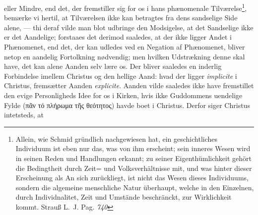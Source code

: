 \documentclass[12pt]{book}
\newcommand{\opage}[1]{\marginnote{\footnotesize\textit{[#1]}}}
\begin{document}
eller
\opage{153} \setcounter{footnote}{0}%
Mindre, end det, der fremstiller sig for os i hans phænomenale
Tilværelse\footnote{Allein, wie Schmid gründlich nachgewiesen hat, ein
geschichtliches Individuum ist eben nur das, was von ihm erscheint; sein inneres
Wesen wird in seinen Reden und Handlungen erkannt; zu seiner Eigenthümlichkeit
gehört die Bedingtheit durch Zeit= und Volksverhältnisse mit, und was hinter
dieser Erscheinung als An sich zurückliegt, ist nicht das Wesen dieses
Individuums, sondern die algemeine menschliche Natur überhaupt, welche in den
Einzelnen, durch Individnalitet, Zeit und Umstände beschränckt, zur Wirklichkeit
kommt. Strauß L.~J. Pag. \textit{740}}, bemærke vi hertil, at Tilværelsen ikke
kan betragtes fra dens sandselige Side alene, --- thi deraf vilde man blot
udbringe den Modsigelse, at det Sandselige ikke er det Aandelige; forstaaes det
derimod saaledes, at der ikke ligger Andet i Phænomenet, end det, der kan udledes
ved en Negation af Phænomenet, bliver netop en aandelig Fortolkning nødvendig;
men hvilken Udstrækning denne skal have, det kan alene Aanden selv lære os. Der
bliver saaledes en inderlig Forbindelse imellem Christus og den hellige Aand:
hvad der ligger \textit{implicite} i Christus, fremsætter Aanden
\textit{explicite}. Aanden vilde saaledes ikke have fremstillet den evige
Personligheds Idee for os i Kirken, hvis ikke Guddommens uendelige Fylde (πᾶν τό
πλήρωμα τῆς θεότητος) havde boet i Christus. Derfor siger Christus intetsteds, at
\end{document}
